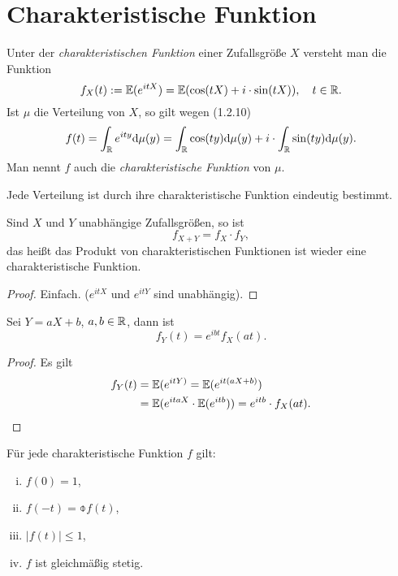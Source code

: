 \section{Charakteristische Funktion}
\begin{prgp}
  Unter der \emph{charakteristischen Funktion} einer Zufallsgröße $X$ versteht
  man die Funktion
  \[ f_X(t) := \mathbb{E}( e^{itX}) = \mathbb{E}( \cos(tX) + i \cdot \sin( tX ) ), \quad t
    \in \mathbb{R}. \]
  Ist $\mu$ die Verteilung von $X$, so gilt wegen (1.2.10)
  \[ f(t) = \int_{\mathbb{R}} e^{ity} \mathrm{d} \mu(y) =
    \int_{\mathbb{R}} \cos (ty) \mathrm{d} \mu(y)
    + i \cdot \int_{\mathbb{R}} \sin(ty) \mathrm{d} \mu(y). \]
  Man nennt $f$ auch die \emph{charakteristische Funktion} von $\mu$.
\end{prgp}

\begin{thm}
  Jede Verteilung ist durch ihre charakteristische Funktion eindeutig bestimmt.
\end{thm}

\begin{thm}
  Sind $X$ und $Y$ unabhängige Zufallsgrößen, so ist
  \[ f_{X+Y} = f_X \cdot f_Y, \]
  das heißt das Produkt von charakteristischen Funktionen ist wieder eine
  charakteristische Funktion.
\end{thm}

\begin{proof}
  Einfach. ($e^{itX}$ und $e^{itY}$ sind unabhängig).
\end{proof}

\begin{thm}
  Sei $Y = aX + b$, $a,b \in \mathbb{R}$, dann ist
  \[ f_Y(t) = e^{ibt} f_X(at). \]
\end{thm}

\begin{proof}
  Es gilt
  \begin{align*}
    f_Y(t)
    &= \mathbb{E}(e^{itY)} = \mathbb{E}( e^{it(aX+b)}) \\
    &= \mathbb{E}( e^{itaX} \cdot \mathbb{E}( e^{itb} ) )
      = e^{itb} \cdot f_X(at). \qedhere
  \end{align*}
\end{proof}

\begin{thm}
  Für jede charakteristische Funktion $f$ gilt:
  \begin{enumerate}[i)]
  \item $f(0) = 1$,
  \item $f(-t) = \obar{f(t)}$,
  \item $|f(t)| \le 1$,
  \item $f$ ist gleichmäßig stetig.
  \end{enumerate}
\end{thm}


